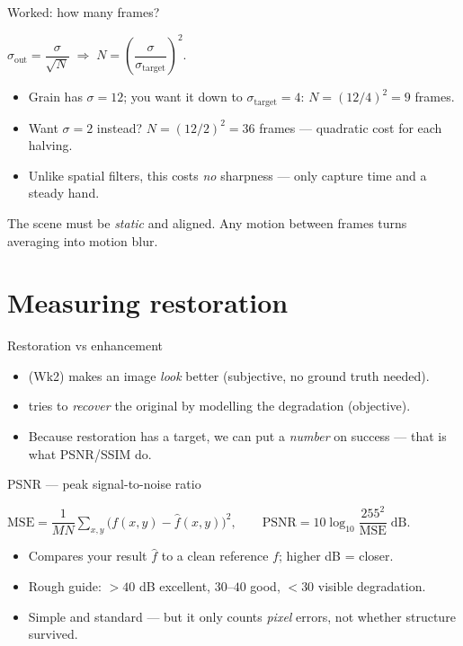 \documentclass[10pt,aspectratio=169]{beamer}
\begin{document}
\begin{frame}{Worked: how many frames?}
  \begin{mathbox}
    $\sigma_{\text{out}}=\dfrac{\sigma}{\sqrt{N}}\;\Rightarrow\; N=\left(\dfrac{\sigma}{\sigma_{\text{target}}}\right)^{2}.$
  \end{mathbox}
  \begin{itemize}
    \item Grain has $\sigma=12$; you want it down to $\sigma_{\text{target}}=4$: $N=(12/4)^2=9$ frames.
    \item Want $\sigma=2$ instead? $N=(12/2)^2=36$ frames — quadratic cost for each halving.
    \item Unlike spatial filters, this costs \emph{no} sharpness — only capture time and a steady hand.
  \end{itemize}
  \begin{badbox}
    The scene must be \emph{static} and aligned. Any motion between frames turns averaging into motion blur.
  \end{badbox}
\end{frame}

\section{Measuring restoration}

\begin{frame}{Restoration vs enhancement}
  \begin{itemize}
    \item {} (Wk2) makes an image \emph{look} better (subjective, no ground truth needed).
    \item {} tries to \emph{recover} the original by modelling the degradation (objective).
    \item Because restoration has a target, we can put a \emph{number} on success — that is what PSNR/SSIM do.
  \end{itemize}
\end{frame}

\begin{frame}{PSNR — peak signal-to-noise ratio}
  \begin{mathbox}
    $\mathrm{MSE}=\dfrac{1}{MN}\sum_{x,y}\big(f(x,y)-\hat f(x,y)\big)^2,\qquad
     \mathrm{PSNR}=10\log_{10}\dfrac{255^2}{\mathrm{MSE}}\;\text{dB}.$
  \end{mathbox}
  \begin{itemize}
    \item Compares your result $\hat f$ to a clean reference $f$; higher dB = closer.
    \item Rough guide: $>40$ dB excellent, $30\text{--}40$ good, $<30$ visible degradation.
    \item Simple and standard — but it only counts \emph{pixel} errors, not whether structure survived.
  \end{itemize}
\end{frame}
\end{document}
